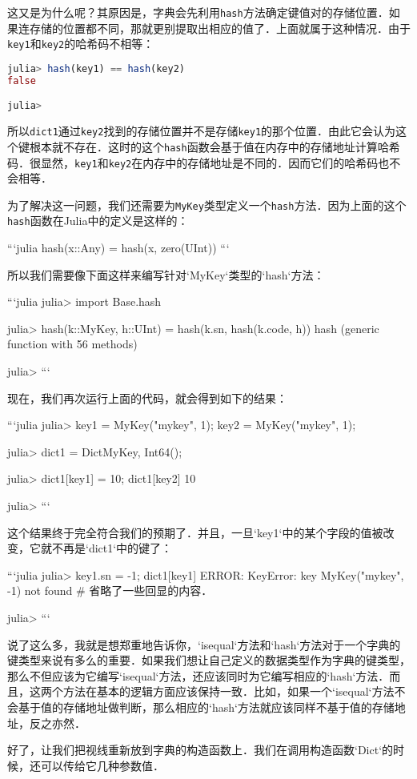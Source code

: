 这又是为什么呢？其原因是，字典会先利用\verb|hash|方法确定键值对的存储位置．如果连存储的位置都不同，那就更别提取出相应的值了．上面就属于这种情况．由于\verb|key1|和\verb|key2|的哈希码不相等：
\begin{lstlisting}[language=julia]
julia> hash(key1) == hash(key2)
false

julia> 
\end{lstlisting}

所以\verb|dict1|通过\verb|key2|找到的存储位置并不是存储\verb|key1|的那个位置．由此它会认为这个键根本就不存在．这时的这个\verb|hash|函数会基于值在内存中的存储地址计算哈希码．很显然，\verb|key1|和\verb|key2|在内存中的存储地址是不同的．因而它们的哈希码也不会相等．

为了解决这一问题，我们还需要为\verb|MyKey|类型定义一个\verb|hash|方法．因为上面的这个\verb|hash|函数在Julia中的定义是这样的：

```julia
hash(x::Any) = hash(x, zero(UInt))
```

所以我们需要像下面这样来编写针对`MyKey`类型的`hash`方法：

```julia
julia> import Base.hash

julia> hash(k::MyKey, h::UInt) = hash(k.sn, hash(k.code, h))
hash (generic function with 56 methods)

julia> 
```

现在，我们再次运行上面的代码，就会得到如下的结果：

```julia
julia> key1 = MyKey("mykey", 1); key2 = MyKey("mykey", 1);

julia> dict1 = Dict{MyKey, Int64}(); 

julia> dict1[key1] = 10; dict1[key2]
10

julia> 
```

这个结果终于完全符合我们的预期了．并且，一旦`key1`中的某个字段的值被改变，它就不再是`dict1`中的键了：

```julia
julia> key1.sn = -1; dict1[key1]
ERROR: KeyError: key MyKey("mykey", -1) not found
# 省略了一些回显的内容．

julia> 
```

说了这么多，我就是想郑重地告诉你，`isequal`方法和`hash`方法对于一个字典的键类型来说有多么的重要．如果我们想让自己定义的数据类型作为字典的键类型，那么不但应该为它编写`isequal`方法，还应该同时为它编写相应的`hash`方法．而且，这两个方法在基本的逻辑方面应该保持一致．比如，如果一个`isequal`方法不会基于值的存储地址做判断，那么相应的`hash`方法就应该同样不基于值的存储地址，反之亦然．

好了，让我们把视线重新放到字典的构造函数上．我们在调用构造函数`Dict`的时候，还可以传给它几种参数值．

